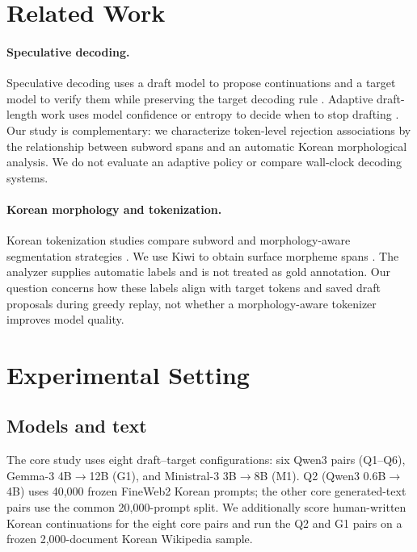 \documentclass[11pt]{article}
\begin{document}
\section{Related Work}
\label{sec:related}

\paragraph{Speculative decoding.}
Speculative decoding uses a draft model to propose continuations and a target
model to verify them while preserving the target decoding rule
\citep{leviathan2023,chen2023speculative}. Adaptive draft-length work uses
model confidence or entropy to decide when to stop drafting
\citep{zhang2025draft}. Our study is complementary: we characterize
token-level rejection associations by the relationship between subword spans
and an automatic Korean morphological analysis. We do not evaluate an adaptive
policy or compare wall-clock decoding systems.

\paragraph{Korean morphology and tokenization.}
Korean tokenization studies compare subword and morphology-aware segmentation
strategies \citep{park2020korean,lee2026morpheme}. We use Kiwi to obtain
surface morpheme spans \citep{lee2024kiwi}. The analyzer supplies automatic
labels and is not treated as gold annotation. Our question concerns how these
labels align with target tokens and saved draft proposals during greedy replay,
not whether a morphology-aware tokenizer improves model quality.

\section{Experimental Setting}
\label{sec:setup}

\subsection{Models and text}

The core study uses eight draft--target configurations: six Qwen3 pairs
(Q1--Q6), Gemma-3 4B$\rightarrow$12B (G1), and Ministral-3 3B$\rightarrow$8B
(M1). Q2 (Qwen3 0.6B$\rightarrow$4B) uses 40,000 frozen FineWeb2 Korean
prompts; the other core generated-text pairs use the common 20,000-prompt
split. We additionally score human-written Korean continuations for the eight
core pairs and run the Q2 and G1 pairs on a frozen 2,000-document Korean
Wikipedia sample.
\end{document}
